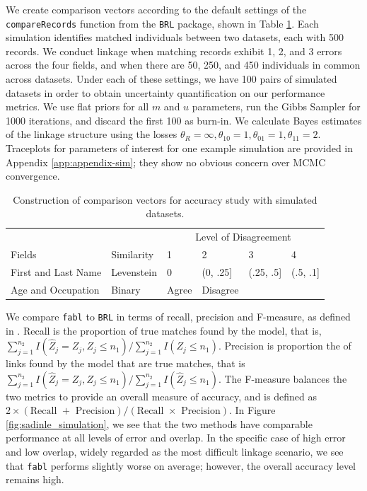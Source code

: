\documentclass[ba]{imsart}
\begin{document}
	We create comparison vectors according to the default settings of the \texttt{compareRecords} function from the \texttt{BRL} package, shown in Table \ref{Tab:sadinle_simulation_cutoffs}. Each simulation identifies matched individuals between two datasets, each with 500 records. We conduct linkage when matching records exhibit 1, 2, and 3 errors across the four fields, and when there are 50, 250, and 450 individuals in common across datasets. Under each of these settings, we have 100 pairs of simulated datasets in order to obtain uncertainty quantification on our performance metrics. We use flat priors for all $m$ and $u$ parameters, run the Gibbs Sampler for 1000 iterations, and discard the first 100 as burn-in. We calculate Bayes estimates of the linkage structure using the losses $\theta_R = \infty, \theta_{10} = 1, \theta_{01} = 1, \theta_{11} = 2$. Traceplots for parameters of interest for one example simulation are provided in Appendix \ref{app:appendix-sim}; they show no obvious concern over MCMC convergence.
	
	\begin{table}[t]
		\centering
		\begin{tabular}[t]{llllll}
			
			\multicolumn{2}{c}{ } & \multicolumn{4}{c}{Level of Disagreement} \\
			\cline{3-6}
			Fields & Similarity & 1 & 2 & 3 & 4\\
			\hline
			First and Last Name & Levenstein & 0 & (0, .25] & (.25, .5] & (.5, .1]\\
			Age and Occupation & Binary & Agree & Disagree &  & \\
			\hline
		\end{tabular}
		\caption{Construction of comparison vectors for accuracy study with simulated datasets.}
		\label{Tab:sadinle_simulation_cutoffs}
	\end{table}
	
	We compare \texttt{fabl} to \texttt{BRL} in terms of recall, precision and F-measure, as defined in \cite{christen_2012}. Recall is the proportion of true matches found by the model, that is, $\sum_{j=1}^{n_2} I(\hat{Z}_j = Z_j, Z_j \leq n_1) / \sum_{j=1}^{n_2} I(Z_j \leq n_1)$. Precision is proportion the of links found by the model that are true matches, that is $\sum_{j=1}^{n_2} I(\hat{Z}_j = Z_j, Z_j \leq n_1) / \sum_{j=1}^{n_2} I(\hat{Z}_j \leq n_1)$. The F-measure balances the two metrics to provide an overall measure of accuracy, and is defined as $2 \times (\text{Recall } + \text{ Precision}) / (\text{Recall } \times \text{ Precision})$. In Figure \ref{fig:sadinle_simulation}, we see that the two methods have comparable performance at all levels of error and overlap. In the specific case of high error and low overlap, widely regarded as the most difficult linkage scenario, we see that \texttt{fabl} performs slightly worse on average; however, the overall accuracy level remains high. 
	
\end{document}
